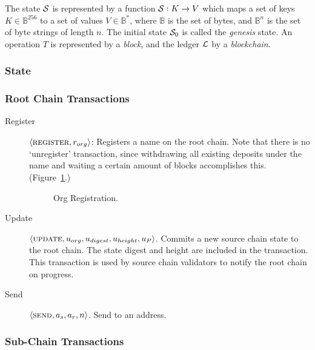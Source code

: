 The state $\mathcal{S}$ is represented by a function $\mathcal{S} : K \to V$ which maps a
set of keys $K \in \mathbb{B}^{256}$ to a set of values $V \in \mathbb{B}^{*}$,
where $\mathbb{B}$ is the set of bytes, and $\mathbb{B}^n$ is the set of byte
strings of length $n$. The initial state $\mathcal{S}_0$ is called the
\emph{genesis} state. An operation $T$ is represented by a \emph{block}, and
the ledger $\mathcal{L}$ by a \emph{blockchain}.

\subsubsection{State}


\subsubsection{Root Chain Transactions}

\begin{description}
    \item[Register] $\langle \text{\normalfont\scshape register}, r_{org} \rangle$: Registers a name on the root
        chain. Note that there is no `unregister' transaction, since
        withdrawing all existing deposits under the name and waiting a certain
        amount of blocks accomplishes this. (Figure~\ref{org-registration}.)
        \begin{figure}
            
            \caption{Org Registration. \label{org-registration}}
        \end{figure}
    \item[Update] $\langle \text{\normalfont\scshape update}, u_{org}, u_{digest}, u_{height}, u_{P} \rangle$. Commits
        a new source chain state to the root chain. The state digest and height
        are included in the transaction. This transaction is used by source
        chain validators to notify the root chain on progress.
    \item[Send] $\langle \text{\normalfont\scshape send}, a_s, a_r, n \rangle$. Send \oscoin{} to an address.
\end{description}

\subsubsection{Sub-Chain Transactions} \label{source-chain-transactions}

